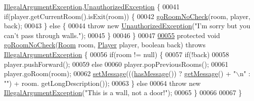 \begin{DoxyCode}
      \hyperlink{classIllegalArgumentException}{IllegalArgumentException},\hyperlink{classUnauthorizedException}{UnauthorizedException} \{
00041         \textcolor{keywordflow}{if}(player.getCurrentRoom().isExit(room)) \{
00042             \hyperlink{classGoCommand_a3149bf695c19b78c39cfc4dadece7846}{goRoomNoCheck}(room, player, back);
00043         \} \textcolor{keywordflow}{else} \{
00044             \textcolor{keywordflow}{throw} \textcolor{keyword}{new} \hyperlink{classUnauthorizedException}{UnauthorizedException}(\textcolor{stringliteral}{"I'm sorry but you can't pass through
       walls."});
00045         \}
00046     \}
00047 
\hypertarget{GoCommand_8java_source_l00055}{}\hyperlink{classGoCommand_a3149bf695c19b78c39cfc4dadece7846}{00055}     \textcolor{keyword}{protected} \textcolor{keywordtype}{void} \hyperlink{classGoCommand_a3149bf695c19b78c39cfc4dadece7846}{goRoomNoCheck}(\hyperlink{classRoom}{Room} room, \hyperlink{classPlayer}{Player} player, \textcolor{keywordtype}{boolean} back) \textcolor{keywordflow}{throws} 
      \hyperlink{classIllegalArgumentException}{IllegalArgumentException} \{
00056         \textcolor{keywordflow}{if}(room != null) \{
00057             \textcolor{keywordflow}{if}(!back)
00058                 player.pushForward();
00059             \textcolor{keywordflow}{else}
00060                 player.popPreviousRooms();
00061             player.goRoom(room);
00062             \hyperlink{classCommand_a715709d8f0ab65879d79ad1725c96f17}{setMessage}(((\hyperlink{classCommand_a3d232d33894a20dc81b7627d84f14183}{hasMessage}()) ? \hyperlink{classCommand_ac3d4abebefb2aea0ce9757bf9c356882}{getMessage}() + \textcolor{stringliteral}{"\(\backslash\)n"} : \textcolor{stringliteral}{""}) + room.
      getLongDescription());
00063         \} \textcolor{keywordflow}{else}
00064             \textcolor{keywordflow}{throw} \textcolor{keyword}{new} \hyperlink{classIllegalArgumentException}{IllegalArgumentException}(\textcolor{stringliteral}{"This is a wall, not a door!"});
00065     \}
00066 
00067 \}
\end{DoxyCode}
